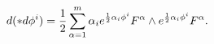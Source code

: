 \begin{equation}
d(\ast d\phi ^{i})=\frac{1}{2}\sum\limits_{\alpha =1}^{m}\alpha _{i}%
e^{\frac{1}{2}\alpha _{i}\phi ^{i}}F^{\alpha }\wedge e^{%
\frac{1}{2}\alpha _{i}\phi ^{i}}F^{\alpha }.
\end{equation}

